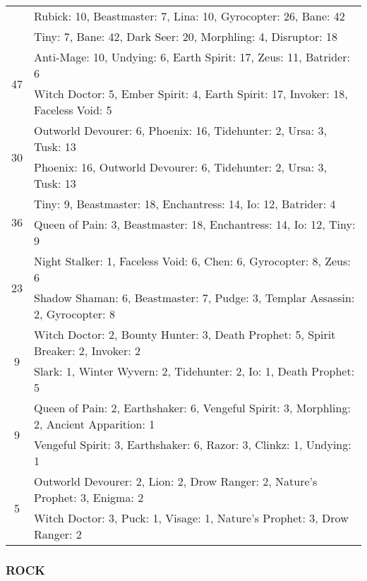 \begin{table}[H]
\begin{tabular}{ | c | p{12.5cm} | }
& Rubick: 10, Beastmaster: 7, Lina: 10, Gyrocopter: 26, Bane: 42 \\
& Tiny: 7, Bane: 42, Dark Seer: 20, Morphling: 4, Disruptor: 18 \\
\hline
\multirow{2}{*}{47}
& Anti-Mage: 10, Undying: 6, Earth Spirit: 17, Zeus: 11, Batrider: 6 \\
& Witch Doctor: 5, Ember Spirit: 4, Earth Spirit: 17, Invoker: 18, Faceless Void: 5 \\
\hline
\multirow{2}{*}{30}
& Outworld Devourer: 6, Phoenix: 16, Tidehunter: 2, Ursa: 3, Tusk: 13 \\
& Phoenix: 16, Outworld Devourer: 6, Tidehunter: 2, Ursa: 3, Tusk: 13 \\
\hline
\multirow{2}{*}{36}
& Tiny: 9, Beastmaster: 18, Enchantress: 14, Io: 12, Batrider: 4 \\
& Queen of Pain: 3, Beastmaster: 18, Enchantress: 14, Io: 12, Tiny: 9 \\
\hline
\multirow{2}{*}{23}
& Night Stalker: 1, Faceless Void: 6, Chen: 6, Gyrocopter: 8, Zeus: 6 \\
& Shadow Shaman: 6, Beastmaster: 7, Pudge: 3, Templar Assassin: 2, Gyrocopter: 8 \\
\hline
\multirow{2}{*}{9}
& Witch Doctor: 2, Bounty Hunter: 3, Death Prophet: 5, Spirit Breaker: 2, Invoker: 2 \\
& Slark: 1, Winter Wyvern: 2, Tidehunter: 2, Io: 1, Death Prophet: 5 \\
\hline
\multirow{2}{*}{9}
& Queen of Pain: 2, Earthshaker: 6, Vengeful Spirit: 3, Morphling: 2, Ancient Apparition: 1 \\
& Vengeful Spirit: 3, Earthshaker: 6, Razor: 3, Clinkz: 1, Undying: 1 \\
\hline
\multirow{2}{*}{5}
& Outworld Devourer: 2, Lion: 2, Drow Ranger: 2, Nature's Prophet: 3, Enigma: 2 \\
& Witch Doctor: 3, Puck: 1, Visage: 1, Nature's Prophet: 3, Drow Ranger: 2 \\
\hline
    \end{tabular}
    \caption{}
    \label{}
    \end{table}


\subsubsection*{ROCK}

